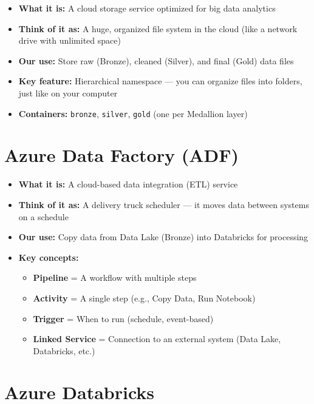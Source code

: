 \documentclass[12pt, a4paper, oneside]{report}
\begin{document}
\begin{itemize}
    \item \textbf{What it is:} A cloud storage service optimized for big data analytics
    \item \textbf{Think of it as:} A huge, organized file system in the cloud (like a network drive with unlimited space)
    \item \textbf{Our use:} Store raw (Bronze), cleaned (Silver), and final (Gold) data files
    \item \textbf{Key feature:} Hierarchical namespace --- you can organize files into folders, just like on your computer
    \item \textbf{Containers:} \texttt{bronze}, \texttt{silver}, \texttt{gold} (one per Medallion layer)
\end{itemize}

\section{Azure Data Factory (ADF)}

\begin{itemize}
    \item \textbf{What it is:} A cloud-based data integration (ETL) service
    \item \textbf{Think of it as:} A delivery truck scheduler --- it moves data between systems on a schedule
    \item \textbf{Our use:} Copy data from Data Lake (Bronze) into Databricks for processing
    \item \textbf{Key concepts:}
    \begin{itemize}
        \item \textbf{Pipeline} = A workflow with multiple steps
        \item \textbf{Activity} = A single step (e.g., Copy Data, Run Notebook)
        \item \textbf{Trigger} = When to run (schedule, event-based)
        \item \textbf{Linked Service} = Connection to an external system (Data Lake, Databricks, etc.)
    \end{itemize}
\end{itemize}

\section{Azure Databricks}
\end{document}
